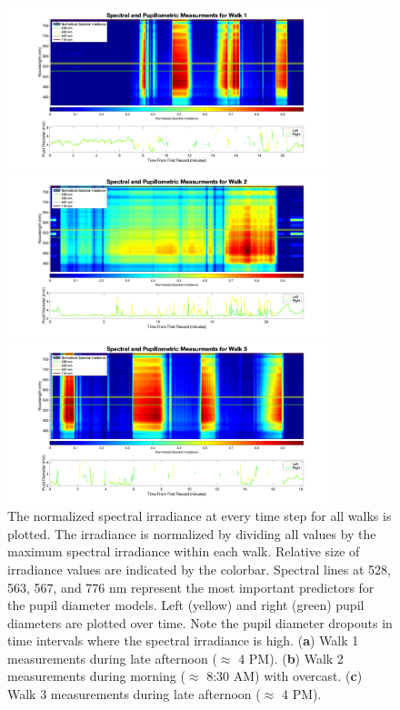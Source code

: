 \documentclass[10pt]{article}
\begin{document}
 \begin{figure}[!tbp]
    \centering
    \includegraphics[width=0.85\textwidth, keepaspectratio]{./spectrum/spectrum3_2wPDRun1.png}
    
    \centering
    \includegraphics[width=0.85\textwidth, keepaspectratio]{./spectrum/spectrum3_2wPDRun2.png}
    
    \centering
    \includegraphics[width=0.85\textwidth, keepaspectratio]{./spectrum/spectrum3_2wPDRun3.png}
    
    \caption{The normalized spectral irradiance at every time step for all walks is plotted. The irradiance is normalized by dividing all values by the maximum spectral irradiance within each walk. Relative size of irradiance values are indicated by the colorbar. Spectral lines at 528, 563, 567, and 776 nm represent the most important predictors for the pupil diameter models. Left (yellow) and right (green) pupil diameters are plotted over time. Note the pupil diameter dropouts in time intervals where the spectral irradiance is high. (\textbf{a}) Walk 1 measurements during late afternoon ($\approx$ 4 PM). (\textbf{b}) Walk 2 measurements during morning ($\approx$ 8:30 AM) with overcast. (\textbf{c}) Walk 3 measurements during late afternoon ($\approx$ 4 PM).}
    
    \label{fig:specPD}
\end{figure}
 
\end{document}
